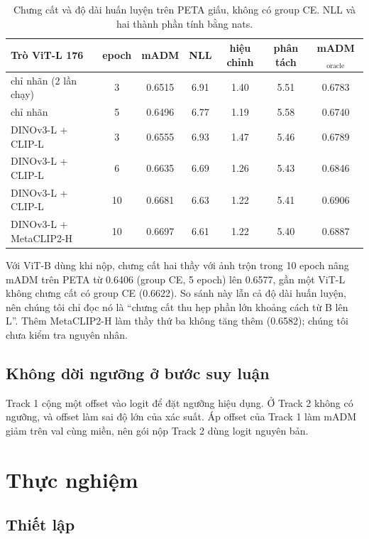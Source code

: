 \documentclass[11pt,a4paper]{article}
\begin{document}
\begin{table}[H]
\centering\small
\begin{tabular}{@{}lcccccc@{}}
\toprule
Trò ViT-L 176 & epoch & mADM & NLL & hiệu chỉnh & phân tách & mADM$_{\text{oracle}}$ \\
\midrule
chỉ nhãn (2 lần chạy) & 3 & 0.6515 & 6.91 & 1.40 & 5.51 & 0.6783 \\
chỉ nhãn & 5 & 0.6496 & 6.77 & 1.19 & 5.58 & 0.6740 \\
DINOv3-L + CLIP-L & 3 & 0.6555 & 6.93 & 1.47 & 5.46 & 0.6789 \\
DINOv3-L + CLIP-L & 6 & 0.6635 & 6.69 & 1.26 & 5.43 & 0.6846 \\
DINOv3-L + CLIP-L & 10 & 0.6681 & 6.63 & 1.22 & 5.41 & 0.6906 \\
DINOv3-L + MetaCLIP2-H & 10 & 0.6697 & 6.61 & 1.22 & 5.40 & 0.6887 \\
\bottomrule
\end{tabular}
\caption{Chưng cất và độ dài huấn luyện trên PETA giấu, không có group CE. NLL và hai thành phần tính bằng nats.}
\label{tab:kd}
\end{table}

Với ViT-B dùng khi nộp, chưng cất hai thầy với ảnh trộn trong 10 epoch nâng mADM trên PETA từ 0.6406 (group CE, 5 epoch) lên 0.6577, gần một ViT-L không chưng cất có group CE (0.6622). So sánh này lẫn cả độ dài huấn luyện, nên chúng tôi chỉ đọc nó là ``chưng cất thu hẹp phần lớn khoảng cách từ B lên L''. Thêm MetaCLIP2-H làm thầy thứ ba không tăng thêm (0.6582); chúng tôi chưa kiểm tra nguyên nhân.

\subsection{Không dời ngưỡng ở bước suy luận}

Track 1 cộng một offset vào logit để đặt ngưỡng hiệu dụng. Ở Track 2 không có ngưỡng, và offset làm sai độ lớn của xác suất. Áp offset của Track 1 làm mADM giảm trên val cùng miền, nên gói nộp Track 2 dùng logit nguyên bản.

\section{Thực nghiệm}
\label{sec:exp}

\subsection{Thiết lập}
\end{document}
